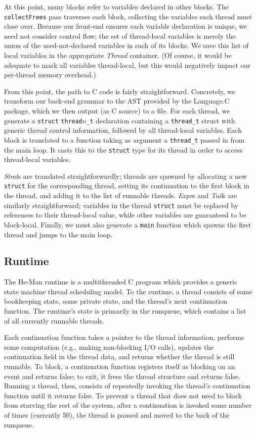 \documentclass[preprint]{sigplanconf}
\renewcommand{\t}{\texttt}
\renewcommand{\i}{\textit}
\begin{document}
At this point, many blocks refer to variables declared in other blocks. The
\t{collectFrees} pass traverses each block, collecting the variables each thread
must close over. Because our front-end ensures each variable declaration is
unique, we need not consider control flow; the set of thread-local variables is
merely the union of the used-not-declared variables in each of its blocks.  We
save this list of local variables in the appropriate \i{Thread} container. (Of
course, it would be adequate to mark all variables thread-local, but this would
negatively impact our per-thread memory overhead.)

From this point, the path to C code is fairly straightforward. Concretely, we
transform our back-end grammar to the AST provided by the Language.C package,
which we then output (as C source) to a file. For each thread, we generate a
\t{struct} \t{thread$n$\_t} declaration containing a \t{thread\_t} struct with
generic thread control information, followed by all thread-local variables. Each
block is translated to a function taking as argument a \t{thread\_t} passed in
from the main loop. It casts this to the \t{struct} type for its thread in order
to access thread-local variables.

\i{Stmt}s are translated straightforwardly; threads are spawned by allocating a
new \t{struct} for the corresponding thread, setting its continuation to the
first block in the thread, and adding it to the list of runnable threads.
\i{Expr}s and \i{Tail}s are similarly straightforward; variables in the thread
\t{struct} must be replaced by references to their thread-local value, while
other variables are guaranteed to be block-local. Finally, we must also generate
a \t{main} function which spawns the first thread and jumps to the main loop.
  
\subsection{Runtime}

The He-Man runtime is a multithreaded C program which provides a generic state
machine thread scheduling model. To the runtime, a thread consists of some
bookkeeping state, some private state, and the thread's next continuation
function. The runtime's state is primarily in the runqueue, which contains a
list of all currently runnable threads.

Each continuation function takes a pointer to the thread information,
performs some computation (e.g., making non-blocking I/O calls),
updates the continuation field in the thread data, and returns whether
the thread is still runnable. To block, a continuation function
registers itself as blocking on an event and returns false; to exit,
it frees the thread structure and returns false. Running a thread,
then, consists of repeatedly invoking the thread's continuation
function until it returns false. To prevent a thread that does not
need to block from starving the rest of the system, after a continuation is
invoked some number of times (currently 50), the thread is paused and moved to
the back of the runqueue.
\end{document}

